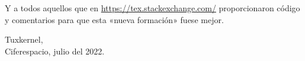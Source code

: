 \documentclass[14pt,twoside,final]{extbook} %
\providecommand\phantomsection{} %
\begin{document}
Y a todos aquellos que en \url{https://tex.stackexchange.com/} proporcionaron código y comentarios para que esta «nueva formación» fuese mejor.
\bigskip
\begin{flushright}
Tuxkernel, \\ Ciferespacio, julio del 2022.
\end{flushright}
\cleardoublepage
\makeatletter
\renewcommand\@dotsep{200} %
\makeatother
\renewcommand{\contentsname}{Índice de contenidos}
\thispagestyle{empty}
\pagestyle{fancy}
\fancyhf{} %
\fancyhead[LE,RO]{\thepage}
\fancyfoot{}
\renewcommand{\headrulewidth}{0pt}
\protect\phantomsection
{}
\tableofcontents
{}
\cleardoublepage
\makeatletter
\renewcommand\@dotsep{200} %
\makeatother
\renewcommand{\listtablename}{Índice de cuadros}
\thispagestyle{empty}
\pagestyle{fancy}
\fancyhf{} %
\fancyhead[RO,LE]{\thepage}
\fancyfoot{}
\renewcommand{\headrulewidth}{0pt}
\protect\phantomsection
{}
\listoftables
{}
\cleardoublepage
\makeatletter
\renewcommand\@dotsep{200} %
\makeatother
\renewcommand{\listfigurename}{Índice de imágenes}
\thispagestyle{empty}
\pagestyle{fancy}
\fancyhf{} %
\fancyhead[RO,LE]{\thepage}
\fancyfoot{}
\renewcommand{\headrulewidth}{0pt}
\protect\phantomsection
{}
\listoffigures
{}
\cleardoublepage
\end{document}
